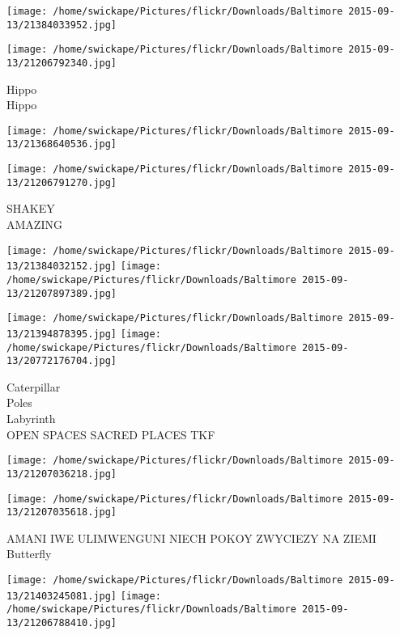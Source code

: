 \documentclass[10pt,letterpaper]{article}
\begin{document}
\texttt{[image: /home/swickape/Pictures/flickr/Downloads/Baltimore 2015-09-13/21384033952.jpg]}

\vspace{0.25in}
\texttt{[image: /home/swickape/Pictures/flickr/Downloads/Baltimore 2015-09-13/21206792340.jpg]}

Hippo\\
Hippo\\
\pagebreak

\texttt{[image: /home/swickape/Pictures/flickr/Downloads/Baltimore 2015-09-13/21368640536.jpg]}

\vspace{0.25in}
\texttt{[image: /home/swickape/Pictures/flickr/Downloads/Baltimore 2015-09-13/21206791270.jpg]}

SHAKEY\\
AMAZING\\
\pagebreak

\texttt{[image: /home/swickape/Pictures/flickr/Downloads/Baltimore 2015-09-13/21384032152.jpg]}
\texttt{[image: /home/swickape/Pictures/flickr/Downloads/Baltimore 2015-09-13/21207897389.jpg]}

\texttt{[image: /home/swickape/Pictures/flickr/Downloads/Baltimore 2015-09-13/21394878395.jpg]}
\texttt{[image: /home/swickape/Pictures/flickr/Downloads/Baltimore 2015-09-13/20772176704.jpg]}

Caterpillar\\
Poles\\
Labyrinth\\
OPEN SPACES SACRED PLACES TKF\\
\pagebreak

\texttt{[image: /home/swickape/Pictures/flickr/Downloads/Baltimore 2015-09-13/21207036218.jpg]}

\vspace{0.25in}
\texttt{[image: /home/swickape/Pictures/flickr/Downloads/Baltimore 2015-09-13/21207035618.jpg]}

AMANI IWE ULIMWENGUNI NIECH POKOY ZWYCIEZY NA ZIEMI\\
Butterfly\\
\pagebreak

\texttt{[image: /home/swickape/Pictures/flickr/Downloads/Baltimore 2015-09-13/21403245081.jpg]}
\texttt{[image: /home/swickape/Pictures/flickr/Downloads/Baltimore 2015-09-13/21206788410.jpg]}
\end{document}

